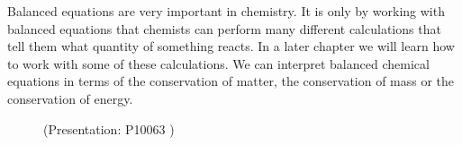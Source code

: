     \label{m38727*eip-429}Balanced equations are very important in chemistry. It is only by working with balanced equations that chemists can perform many different calculations that tell them what quantity of something reacts. In a later chapter we will learn how to work with some of these calculations. We can interpret balanced chemical equations in terms of the conservation of matter, the conservation of mass or the conservation of energy. \label{m38727*eip-366}
    \setcounter{subfigure}{0}
	\begin{figure}[H] %
    \label{m38727*slidesharemedia}\label{m38727*slideshareflash} { (Presentation:  P10063 )} \end{figure}
